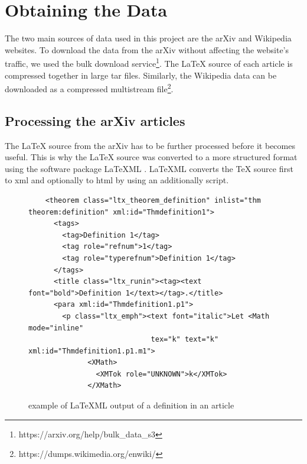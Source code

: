 \documentclass[a4paper]{easychair}
\begin{document}
\section{Obtaining the Data}
The two main sources of data used in this project are the arXiv and Wikipedia websites. To download the data from the arXiv without affecting the website's traffic, we used the bulk download service\footnote{https://arxiv.org/help/bulk\_data\_s3}. The \LaTeX{} source of each article is compressed together in large tar files. Similarly, the Wikipedia data can be downloaded as a compressed multistream file\footnote{https://dumps.wikimedia.org/enwiki/}. 

\subsection{Processing the arXiv articles}
The \LaTeX{} source from the arXiv has to be further processed before it becomes useful. This is why the \LaTeX{} source was converted to a more structured format using the software package LaTeXML \cite{miller3latexml}. LaTeXML converts the \TeX{} source first to xml and optionally to html by using an additionally script. 

\begin{center}
\begin{figure}[h]
\begin{lstlisting}
    <theorem class="ltx_theorem_definition" inlist="thm theorem:definition" xml:id="Thmdefinition1">
      <tags>
        <tag>Definition 1</tag>
        <tag role="refnum">1</tag>
        <tag role="typerefnum">Definition 1</tag>
      </tags>
      <title class="ltx_runin"><tag><text font="bold">Definition 1</text></tag>.</title>
      <para xml:id="Thmdefinition1.p1">
        <p class="ltx_emph"><text font="italic">Let <Math mode="inline" 
                             tex="k" text="k" xml:id="Thmdefinition1.p1.m1">
              <XMath>
                <XMTok role="UNKNOWN">k</XMTok>
              </XMath>
\end{lstlisting}
    \caption{\label{xml1} example of LaTeXML output of a definition in an article}
\end{figure}
\end{center}

\end{document}
